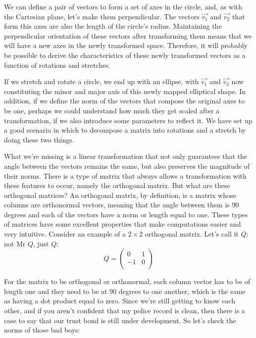 \documentclass[a4,12pt,twosided,openany]{memoir}
\begin{document}
We can define a pair of vectors to form a set of axes in the circle, and, as with the Cartesian plane, let’s make them perpendicular. The vectors $\overrightarrow{v_1}$ and $\overrightarrow{v_2}$ that form this axes are also the length of the circle’s radius. Maintaining the perpendicular orientation of these vectors after transforming them means that we will have a new axes in the newly transformed space. Therefore, it will probably be possible to derive the characteristics of these newly transformed vectors as a function of rotations and stretches. 
\par 
\indent
If we stretch and rotate a circle, we end up with an ellipse, with $\overrightarrow{v_1}$ and $\overrightarrow{v_2}$ now constituting the minor and major axis of this newly mapped elliptical shape. In addition, if we define the norm of the vectors that compose the original axes to be one, perhaps we could understand how much they get scaled after a transformation, if we also introduce some parameters to reflect it. We have set up a good scenario in which to decompose a matrix into rotations and a stretch by doing these two things. 
\par 
\indent
What we’re missing is a linear transformation that not only guarantees that the angle between the vectors remains the same, but also preserves the magnitude of their norms. There is a type of matrix that always allows a transformation with these features to occur, namely the orthogonal matrix. But what are these orthogonal matrices? An orthogonal matrix, by definition, is a matrix whose columns are orthonormal vectors, meaning that the angle between them is 90 degrees and each of the vectors have a norm or length equal to one. These types of matrices have some excellent properties that make computations easier and very intuitive. Consider an example of a $2 \times 2$ orthogonal matrix. Let’s call it $Q$: not Mr $Q$, just $Q$:
\[Q = \begin{pmatrix}
0 & 1 \\
-1 & 0 \\
\end{pmatrix}
\]
\par 
\indent
For the matrix to be orthogonal or orthonormal, each column vector has to be of length one and they need to be at 90 degrees to one another, which is the same as having a dot product equal to zero. Since we’re still getting to know each other, and if you aren’t confident that my police record is clean, then there is a case to say that our trust bond is still under development. So let’s check the norms of those bad boys:
\end{document}
